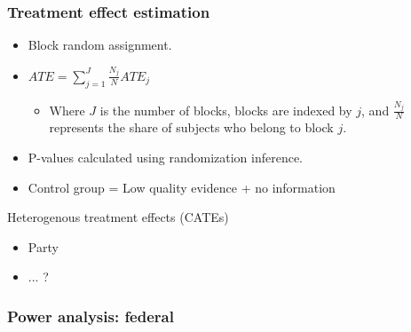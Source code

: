 \documentclass[usenames,dvipsnames]{beamer}
\begin{document}
\begin{frame}
\frametitle{Treatment effect estimation}

\begin{itemize}
\item Block random assignment.
\item $ATE = \sum_{j = 1}^{J} \frac{N_j}{N}ATE_j$
\begin{itemize}
\item Where $J$ is the number of blocks, blocks are indexed by $j$, and $\frac{N_j}{N}$ represents the share of subjects who belong to block $j$. 
\end{itemize}
\item P-values calculated using randomization inference.
\item Control group = Low quality evidence + no information
\end{itemize}
Heterogenous treatment effects (CATEs)
\begin{itemize}
\item Party
\item ... ?
\end{itemize}

\end{frame}


\begin{frame}
\frametitle{Power analysis: federal}


\end{frame}
\end{document}
